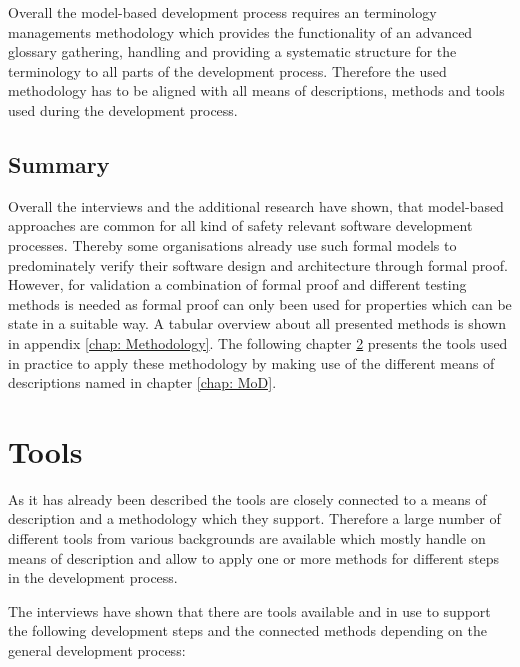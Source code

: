\documentclass{./template/openetcs_report}
\begin{document}
Overall the model-based development process requires an terminology managements methodology which provides the functionality of an advanced glossary gathering, handling and providing a systematic structure for the terminology to all parts of the development process. Therefore the used methodology has to be aligned with all means of descriptions, methods and tools used during the development process. 

\section{Summary}

Overall the interviews and the additional research have shown, that model-based approaches are common for all kind of safety relevant software development processes. Thereby some organisations already use such formal models to predominately verify their software design and architecture through formal proof. However, for validation a combination of formal proof and different testing methods is needed as formal proof can only been used for properties which can be state in a suitable way. A tabular overview about all presented methods is shown in appendix \ref{chap: Methodology}. The following chapter \ref{chap: tools} presents the tools used in practice to apply these methodology by making use of the different means of descriptions named in chapter \ref{chap: MoD}.


\chapter{Tools}

\label{chap: tools}

As it has already been described the tools are closely connected to a means of description  and a methodology which they support. Therefore a large number of different tools from various backgrounds are available which mostly handle on means of description and allow to apply one or more methods for different steps in the development process.

The interviews have shown that there are tools available and in use to support the following development steps and the connected methods depending on the general development process:
\end{document}
